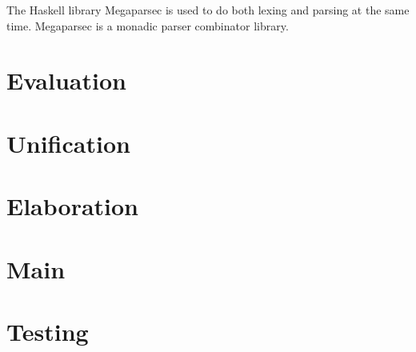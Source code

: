 The Haskell library Megaparsec is used to do both lexing and parsing at the same
time. Megaparsec is a monadic parser combinator library.

\section{Evaluation}

\section{Unification}

\section{Elaboration}

\section{Main}

\section{Testing}
